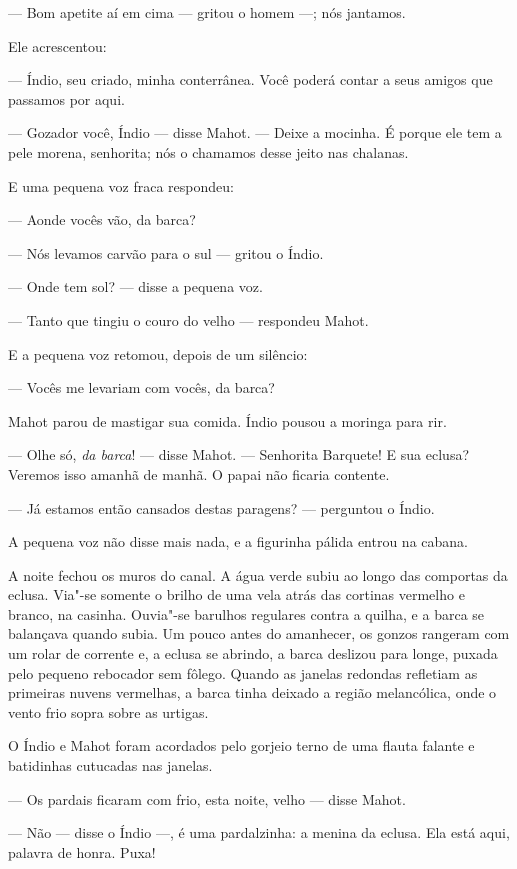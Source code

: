 --- Bom apetite aí em cima --- gritou o homem ---; nós jantamos.

Ele acrescentou:

--- Índio, seu criado, minha conterrânea. Você poderá contar a seus amigos
que passamos por aqui.

--- Gozador você, Índio --- disse Mahot. --- Deixe a mocinha. É porque ele tem
a pele morena, senhorita; nós o chamamos desse jeito nas chalanas.

E uma pequena voz fraca respondeu:

--- Aonde vocês vão, da barca?

--- Nós levamos carvão para o sul --- gritou o Índio.

--- Onde tem sol? --- disse a pequena voz.

--- Tanto que tingiu o couro do velho --- respondeu Mahot.

E a pequena voz retomou, depois de um silêncio:

--- Vocês me levariam com vocês, da barca?

Mahot parou de mastigar sua comida. Índio pousou a moringa para rir.

--- Olhe só, \textit{da barca}! --- disse Mahot. --- Senhorita Barquete! E sua
eclusa? Veremos isso amanhã de manhã. O papai não ficaria contente.

--- Já estamos então cansados destas paragens? --- perguntou o Índio.

A pequena voz não disse mais nada, e a figurinha pálida entrou na cabana.

A noite fechou os muros do canal. A água verde subiu ao longo das
comportas da eclusa. Via"-se somente o brilho de uma vela atrás das
cortinas vermelho e branco, na casinha. Ouvia"-se barulhos regulares contra a
quilha, e a barca se balançava quando subia. Um pouco antes do amanhecer,
os gonzos rangeram com um rolar de corrente e, a eclusa se abrindo, a
barca deslizou para longe, puxada pelo pequeno rebocador sem fôlego.
Quando as janelas redondas refletiam as primeiras nuvens vermelhas, a
barca tinha deixado a região melancólica, onde o vento frio sopra sobre as urtigas.

O Índio e Mahot foram acordados pelo gorjeio terno de uma flauta falante
e batidinhas cutucadas nas janelas.

--- Os pardais ficaram com frio, esta noite, velho --- disse Mahot.

--- Não --- disse o Índio ---, é uma pardalzinha: a menina da eclusa. Ela está
aqui, palavra de honra. Puxa!


